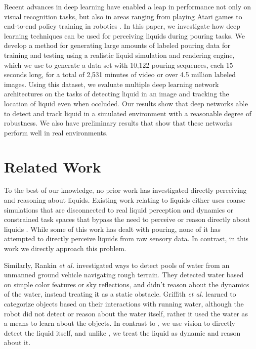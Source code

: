 \documentclass[runningheads,a4paper]{llncs}
\begin{document}
Recent advances in deep learning have enabled a leap in performance not only on visual recognition tasks, but also in areas ranging from playing Atari games \cite{guo2014} to end-to-end policy training in robotics \cite{levine2015}.  
In this paper, we investigate how deep learning techniques can be used for perceiving liquids during pouring tasks.  
We develop a method for generating large amounts of labeled pouring data for training and testing using a realistic liquid simulation and rendering engine, which we use to generate a data set with 10,122 pouring sequences, each 15 seconds long, for a total of 2,531 minutes of video or over 4.5 million labeled images. 
Using this dataset, we evaluate multiple deep learning network architectures on the tasks of detecting liquid in an image and tracking the location of liquid even when occluded. 
Our results show that deep networks able to detect and track liquid in a simulated environment with a reasonable degree of robustness. 
We also have preliminary results that show that these networks perform well in real environments.

\vspace{-0.5cm}
\section{Related Work}
\vspace{-0.3cm}

To the best of our knowledge, no prior work has investigated directly perceiving
and reasoning about liquids. Existing work relating to liquids either uses
coarse simulations that are disconnected to real liquid perception and dynamics
\cite{kunze2015,yamaguchi2015} or constrained task spaces that bypass
the need to perceive or reason directly about liquids
\cite{langsfeld2014,okada2006,tamosiunaite2011,cakmak2012,rozo2013}. 
While some of this work has dealt with pouring, none of it has attempted to directly perceive liquids from raw sensory data. 
In contrast, in this work we directly approach this problem.

Similarly, Rankin {\it et al.} \cite{rankin2010,rankin2011} investigated ways to detect pools of water from an unmanned ground vehicle navigating rough terrain. 
They detected water based on simple color features or sky reflections, and didn't reason about the dynamics of the water, instead treating it as a static obstacle. 
Griffith {\it et al.} \cite{griffith2012} learned to categorize objects based on their interactions with running water, although the robot did not detect or reason about the water itself, rather it used the water as a means to learn about the objects.
In contrast to \cite{griffith2012}, we use vision to directly detect the liquid itself, and unlike \cite{rankin2010,rankin2011}, we treat the liquid as dynamic and reason about it.
\end{document}
